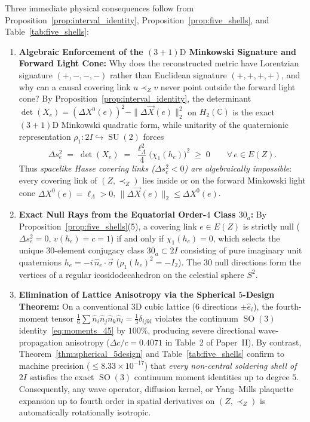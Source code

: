 \documentclass[11pt,a4paper]{article}
\theoremstyle{definition}
\theoremstyle{remark}
\newcommand{\C}{\mathbb{C}}
\newcommand{\SU}{\operatorname{SU}}
\newcommand{\SO}{\operatorname{SO}}
\begin{document}
Three immediate physical consequences follow from Proposition~\ref{prop:interval_identity}, Proposition~\ref{prop:five_shells}, and Table~\ref{tab:five_shells}:
\begin{enumerate}
    \item \textbf{Algebraic Enforcement of the $(3+1)\text{D}$ Minkowski Signature and Forward Light Cone:} Why does the reconstructed metric have Lorentzian signature $(+,-,-,-)$ rather than Euclidean signature $(+,+,+,+)$, and why can a causal covering link $u \prec_Z v$ never point outside the forward light cone? By Proposition~\ref{prop:interval_identity}, the determinant $\det(X_e) = (\Delta X^0(e))^2 - \|\Delta \vec{X}(e)\|_2^2$ on $H_2(\C)$ is the exact $(3+1)\text{D}$ Minkowski quadratic form, while unitarity of the quaternionic representation $\rho_1 : 2I \hookrightarrow \SU(2)$ forces
    \begin{equation}
    \Delta s_e^2 \;=\; \det(X_e) \;=\; \frac{\ell_\Lambda^2}{4}\bigl(\chi_1(h_e)\bigr)^2 \;\ge\; 0 \qquad \forall\, e \in E(Z).
    \end{equation}
    Thus \emph{spacelike Hasse covering links ($\Delta s_e^2 < 0$) are algebraically impossible}: every covering link of $(Z, \prec_Z)$ lies inside or on the forward Minkowski light cone $\Delta X^0(e) = \ell_\Lambda > 0$, $\|\Delta \vec{X}(e)\|_2 \le \Delta X^0(e)$.
    \item \textbf{Exact Null Rays from the Equatorial Order-$4$ Class $30_a$:} By Proposition~\ref{prop:five_shells}(5), a covering link $e \in E(Z)$ is strictly null ($\Delta s_e^2 = 0$, $v(h_e) = c = 1$) if and only if $\chi_1(h_e) = 0$, which selects the unique $30$-element conjugacy class $30_a \subset 2I$ consisting of pure imaginary unit quaternions $h_e = -i\,\hat{n}_e\cdot\vec{\sigma}$ ($\rho_1(h_e)^2 = -I_2$). The $30$ null directions form the vertices of a regular icosidodecahedron on the celestial sphere $S^2$.
    \item \textbf{Elimination of Lattice Anisotropy via the Spherical $5$-Design Theorem:} On a conventional $3\text{D}$ cubic lattice ($6$ directions $\pm\hat{e}_i$), the fourth-moment tensor $\frac{1}{6}\sum \hat{n}_i\hat{n}_j\hat{n}_k\hat{n}_l = \frac{1}{3}\delta_{ijkl}$ violates the continuum $\SO(3)$ identity~\eqref{eq:moments_45} by $100\%$, producing severe directional wave-propagation anisotropy ($\Delta c / c = 0.4071$ in Table~2 of Paper~II). By contrast, Theorem~\ref{thm:spherical_5design} and Table~\ref{tab:five_shells} confirm to machine precision ($\le 8.33 \times 10^{-17}$) that \emph{every non-central soldering shell of $2I$} satisfies the exact $\SO(3)$ continuum moment identities up to degree $5$. Consequently, any wave operator, diffusion kernel, or Yang--Mills plaquette expansion up to fourth order in spatial derivatives on $(Z, \prec_Z)$ is automatically rotationally isotropic.
\end{enumerate}
\end{document}
